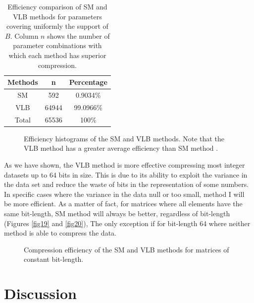 \documentclass[10pt]{article}
\begin{document}
\begin{table}[h]
 \centering
 \caption{Efficiency comparison of SM and VLB methods for parameters covering uniformly the support of $B$. Column $n$ shows the number of parameter combinations with which each method has superior compression.}
 \begin{tabular}{ccc}
  \hline 
  Methods  & n   & Percentage \\
  \hline
  SM	   & 592	& 0.9034\% \\
  VLB	   & 64944	& 99.0966\% \\
  \hline
  Total    & 65536	& 100\% \\
  \hline
 \end{tabular}
 \label{tab:02}
\end{table}

\begin{figure}[h]
  \centering
  \caption{Efficiency histograms of the SM and VLB methods. Note that the VLB method has a greater average efficiency than SM method .}
  \label{fig:1718}
\end{figure}

As we have shown, the VLB method is more effective compressing most integer datasets up to 64 bits in size. This is due to its ability to exploit the variance in the data set and reduce the waste of bits in the representation of some numbers. In specific cases where the variance in the data null or too small, method I will be more efficient. As a matter of fact, for matrices where all elements have the same bit-length, SM method  will always be better, regardless of bit-length (Figures \ref{fig19} and \ref{fig20}), The only exception if for bit-length 64 where neither method is able to compress the data. 

\begin{figure}[h]
  \centering
  \caption{Compression efficiency of the SM and VLB methods for matrices of constant bit-length.}
  \label{fig:1920}
\end{figure}

\section*{Discussion}
\end{document}
